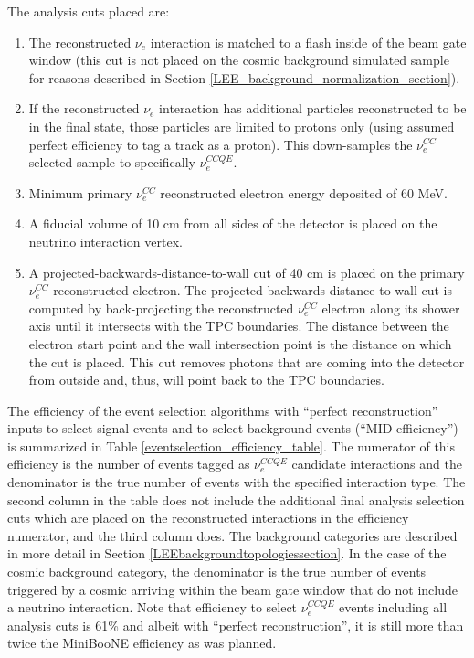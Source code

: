 The analysis cuts placed are:
\begin{enumerate}
\item The reconstructed $\nu_e$ interaction is matched to a flash inside of the beam gate window (this cut is not placed on the cosmic background simulated sample for reasons described in Section \ref{LEE_background_normalization_section}).
\item If the reconstructed $\nu_e$ interaction has additional particles reconstructed to be in the final state, those particles are limited to protons only (using assumed perfect efficiency to tag a track as a proton). This down-samples the $\nu_e^{CC}$ selected sample to specifically $\nu_e^{CCQE}$.
\item Minimum primary $\nu_e^{CC}$ reconstructed electron energy deposited of 60 MeV.
\item A fiducial volume of 10 cm from all sides of the detector is placed on the neutrino interaction vertex.
\item A projected-backwards-distance-to-wall cut of 40 cm is placed on the primary $\nu_e^{CC}$ reconstructed electron. The projected-backwards-distance-to-wall cut is computed by back-projecting the reconstructed $\nu_e^{CC}$ electron along its shower axis until it intersects with the TPC boundaries. The distance between the electron start point and the wall intersection point is the distance on which the cut is placed. This cut removes photons that are coming into the detector from outside and, thus, will point back to the TPC boundaries.
\end{enumerate}



The efficiency of the event selection algorithms with ``perfect reconstruction'' inputs to select signal events and to select background events (``MID efficiency'') is summarized in Table \ref{eventselection_efficiency_table}. The numerator of this efficiency is the number of events tagged as $\nu_e^{CCQE}$ candidate interactions and the denominator is the true number of events with the specified interaction type. The second column in the table does not include the additional final analysis selection cuts which are placed on the reconstructed interactions in the efficiency numerator, and the third column does. The background categories are described in more detail in Section \ref{LEEbackgroundtopologiessection}. In the case of the cosmic background category, the denominator is the true number of events triggered by a cosmic arriving within the beam gate window that do not include a neutrino interaction. Note that efficiency to select $\nu_e^{CCQE}$ events including all analysis cuts is 61\% and albeit with ``perfect reconstruction'', it is still more than twice the MiniBooNE efficiency as was planned.\\


